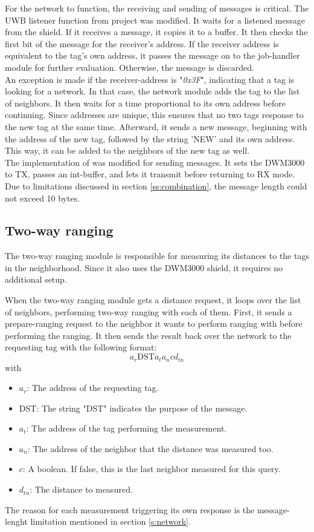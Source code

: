 For the network to function, the receiving and sending of messages is critical.
The UWB listener function from project \cite{degkwitz2023ultrawideband} was modified.
It waits for a listened message from the shield.
If it receives a message, it copies it to a buffer.
It then checks the first bit of the message for the receiver's address.
If the receiver address is equivalent to the tag's own address, it passes the message on to the job-handler module for further evaluation.
Otherwise, the message is discarded.\\
An exception is made if the receiver-address is "\textit{0x3F}", indicating that a tag is looking for a network.
In that case, the network module adds the tag to the list of neighbors.
It then waits for a time proportional to its own address before continuing.
Since addresses are unique, this ensures that no two tags response to the new tag at the same time.
Afterward, it sends a new message, beginning with the address of the new tag, followed by the string 'NEW' and its own address.
This way, it can be added to the neighbors of the new tag as well.\\
The implementation of \cite{degkwitz2023ultrawideband} was modified for sending messages.
It sets the DWM3000 to TX, passes an int-buffer, and lets it transmit before returning to RX mode.
Due to limitations discussed in section \ref{ss:combination}, the message length could not exceed 10 bytes. 


\subsection{Two-way ranging}
\label{ss:two_way_ranging}
The two-way ranging module is responsible for measuring its distances to the tags in the neighborhood.
Since it also uses the DWM3000 shield, it requires no additional setup.


When the two-way ranging module gets a distance request, it loops over the list of neighbors, performing two-way ranging with each of them.
First, it sends a prepare-ranging request to the neighbor it wants to perform ranging with before performing the ranging.
It then sends the result back over the network to the requesting tag with the following format: 
\begin{equation}
	\mbox{$a_r$DST$a_ta_ncd_{tn}$}
\end{equation}
with
\begin{itemize}
	\item $a_r$: The address of the requesting tag.
	\item DST: The string "DST" indicates the purpose of the message.
	\item $a_t$: The address of the tag performing the measurement.
	\item $a_n$: The address of the neighbor that the distance was measured too.
	\item $c$: A boolean. If false, this is the last neighbor measured for this query.
	\item $d_{tn}$: The distance to measured. 
\end{itemize}
The reason for each measurement triggering its own response is the message-lenght limitation mentioned in section \ref{s:network}.

